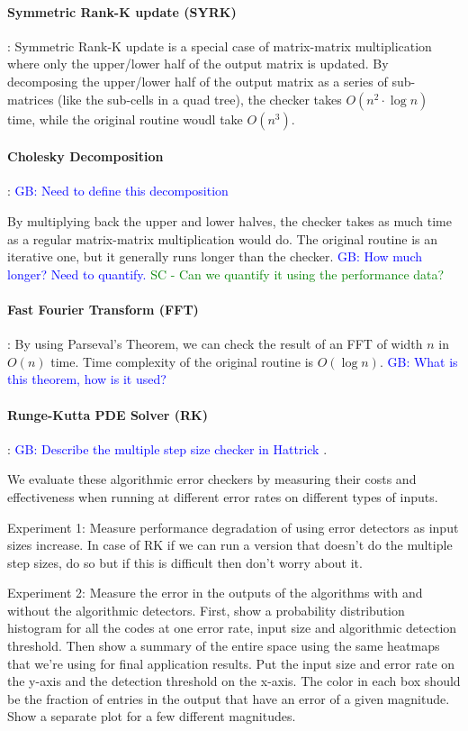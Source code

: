 \documentclass[prodmode,acmtecs]{acmconf} %
\newcommand{\sui}[1]{%
  \textcolor{green}{SC - #1}
}
\newcommand{\greg}[1]{%
  \textcolor{blue}{GB: #1}
}
\begin{document}
\paragraph{Symmetric Rank-K update (SYRK)}:
Symmetric Rank-K update is a special case of matrix-matrix multiplication where only the upper/lower half of the output matrix is updated. By decomposing the upper/lower half of the output matrix as a series of sub-matrices (like the sub-cells in a quad tree), the checker takes $O(n^2 \cdot \log{n})$ time, while the original routine woudl take $O(n^3)$.

\paragraph{Cholesky Decomposition}: \greg{Need to define this decomposition}
By multiplying back the upper and lower halves, the checker takes as much time as a regular matrix-matrix multiplication would do. The original routine is an iterative one, but it generally runs longer than the checker. \greg{How much longer? Need to quantify.} \sui{Can we quantify it using the performance data?}

\paragraph{Fast Fourier Transform (FFT)}:
By using Parseval's Theorem, we can check the result of an FFT of width $n$ in $O(n)$ time. Time complexity of the original routine is $O(\log{n})$.
\greg{What is this theorem, how is it used?}

\paragraph{Runge-Kutta PDE Solver (RK)}:
\greg{Describe the multiple step size checker in Hattrick}.

We evaluate these algorithmic error checkers by measuring their costs and effectiveness when running at different error rates on different types of inputs.

Experiment 1: Measure performance degradation of using error detectors as input sizes increase. In case of RK if we can run a version that doesn't do the multiple step sizes, do so but if this is difficult then don't worry about it.

Experiment 2: Measure the error in the outputs of the algorithms with and without the algorithmic detectors. 
First, show a probability distribution histogram for all the codes at one error rate, input size and algorithmic detection threshold.
Then show a summary of the entire space using the same heatmaps that we're using for final application results.
Put the input size and error rate on the y-axis and the detection threshold on the x-axis.
The color in each box should be the fraction of entries in the output that have an error of a given magnitude.
Show a separate plot for a few different magnitudes.
\end{document}
